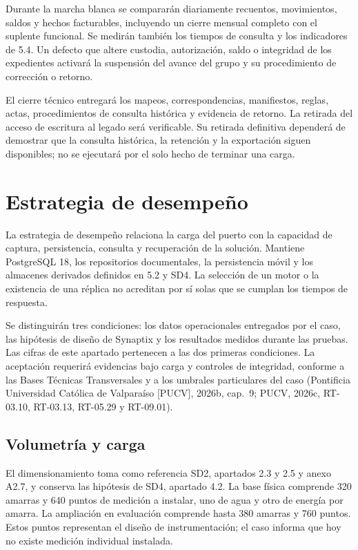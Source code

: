 Durante la marcha blanca se compararán diariamente recuentos, movimientos, saldos y hechos facturables, incluyendo un cierre mensual completo con el suplente funcional. Se medirán también los tiempos de consulta y los indicadores de 5.4. Un defecto que altere custodia, autorización, saldo o integridad de los expedientes activará la suspensión del avance del grupo y su procedimiento de corrección o retorno.

El cierre técnico entregará los mapeos, correspondencias, manifiestos, reglas, actas, procedimientos de consulta histórica y evidencia de retorno. La retirada del acceso de escritura al legado será verificable. Su retirada definitiva dependerá de demostrar que la consulta histórica, la retención y la exportación siguen disponibles; no se ejecutará por el solo hecho de terminar una carga.


\newpage
\section{Estrategia de desempeño} %
\label{sec:sd5_desempeno}
La estrategia de desempeño relaciona la carga del puerto con la capacidad de captura, persistencia, consulta y recuperación de la solución. Mantiene PostgreSQL 18, los repositorios documentales, la persistencia móvil y los almacenes derivados definidos en 5.2 y SD4. La selección de un motor o la existencia de una réplica no acreditan por sí solas que se cumplan los tiempos de respuesta.

Se distinguirán tres condiciones: los datos operacionales entregados por el caso, las hipótesis de diseño de Synaptix y los resultados medidos durante las pruebas. Las cifras de este apartado pertenecen a las dos primeras condiciones. La aceptación requerirá evidencias bajo carga y controles de integridad, conforme a las Bases Técnicas Transversales y a los umbrales particulares del caso (Pontificia Universidad Católica de Valparaíso [PUCV], 2026b, cap.~9; PUCV, 2026c, RT-03.10, RT-03.13, RT-05.29 y RT-09.01).

\subsection{Volumetría y carga}
\label{subsec:sd5_volumetria}

El dimensionamiento toma como referencia SD2, apartados 2.3 y 2.5 y anexo A2.7, y conserva las hipótesis de SD4, apartado 4.2. La base física comprende 320 amarras y 640 puntos de medición a instalar, uno de agua y otro de energía por amarra. La ampliación en evaluación comprende hasta 380 amarras y 760 puntos. Estos puntos representan el diseño de instrumentación; el caso informa que hoy no existe medición individual instalada.

